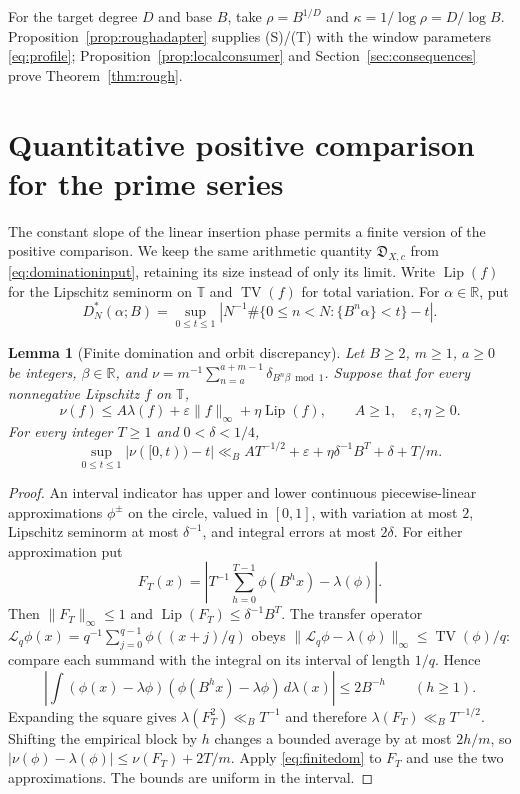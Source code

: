 \documentclass[11pt,a4paper]{article}
\newtheorem{lemma}[theorem]{Lemma}
\newcommand{\R}{\mathbb R}
\begin{document}
For the target degree $D$ and base $B$, take $\rho=B^{1/D}$ and
$\kappa=1/\log\rho=D/\log B$. Proposition~\ref{prop:roughadapter}
supplies (S)/(T) with the window parameters \eqref{eq:profile};
Proposition~\ref{prop:localconsumer} and
Section~\ref{sec:consequences} prove Theorem~\ref{thm:rough}.

\section[Quantitative positive comparison]{Quantitative positive comparison for the prime series}
\label{app:quantitative}

The constant slope of the linear insertion phase permits a finite version
of the positive comparison. We keep the same arithmetic quantity
$\mathfrak D_{X,c}$ from \eqref{eq:dominationinput}, retaining its size
instead of only its limit. Write $\operatorname{Lip}(f)$ for the Lipschitz
seminorm on $\mathbb T$ and $\operatorname{TV}(f)$ for total variation.
For $\alpha\in\R$, put
\[
 D_N^*(\alpha;B)=\sup_{0\le t\le1}
 \left|N^{-1}\#\{0\le n<N:\{B^n\alpha\}<t\}-t\right|.
\]

\begin{lemma}[Finite domination and orbit discrepancy]\label{lem:quantorbit}
Let $B\ge2$, $m\ge1$, $a\ge0$ be integers, $\beta\in\R$, and
$\nu=m^{-1}\sum_{n=a}^{a+m-1}\delta_{B^n\beta\bmod1}$.
Suppose that for every nonnegative Lipschitz $f$ on $\mathbb T$,
\begin{equation}\label{eq:finitedom}
 \nu(f)\le A\lambda(f)+\varepsilon\|f\|_\infty
                  +\eta\operatorname{Lip}(f),\qquad
 A\ge1,\quad\varepsilon,\eta\ge0.
\end{equation}
For every integer $T\ge1$ and $0<\delta<1/4$,
\[
 \sup_{0\le t\le1}|\nu([0,t))-t|
 \ll_B A T^{-1/2}+\varepsilon+
                 \eta\delta^{-1}B^T+\delta+T/m.
\]
\end{lemma}
\begin{proof}
An interval indicator has upper and lower continuous piecewise-linear
approximations $\phi^\pm$ on the circle, valued in $[0,1]$, with variation
at most $2$, Lipschitz seminorm at most $\delta^{-1}$, and integral errors
at most $2\delta$. For either approximation put
\[
 F_T(x)=\left|T^{-1}\sum_{h=0}^{T-1}\phi(B^hx)-\lambda(\phi)\right|.
\]
Then $\|F_T\|_\infty\le1$ and
$\operatorname{Lip}(F_T)\le\delta^{-1}B^T$.
The transfer operator
$\mathcal L_q\phi(x)=q^{-1}\sum_{j=0}^{q-1}\phi((x+j)/q)$ obeys
$\|\mathcal L_q\phi-\lambda(\phi)\|_\infty
\le\operatorname{TV}(\phi)/q$: compare each summand with the integral
on its interval of length $1/q$. Hence
\[
 \left|\int(\phi(x)-\lambda\phi)
              (\phi(B^hx)-\lambda\phi)\,d\lambda(x)\right|
 \le2B^{-h}\qquad(h\ge1).
\]
Expanding the square gives $\lambda(F_T^2)\ll_B T^{-1}$ and therefore
$\lambda(F_T)\ll_B T^{-1/2}$.
Shifting the empirical block by $h$ changes a bounded average by at most
$2h/m$, so
$|\nu(\phi)-\lambda(\phi)|\le\nu(F_T)+2T/m$.
Apply \eqref{eq:finitedom} to $F_T$ and use the two approximations.
The bounds are uniform in the interval.
\end{proof}
\end{document}
